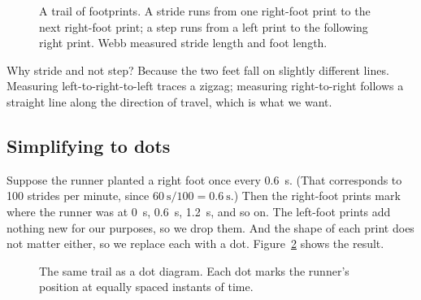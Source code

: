 \documentclass[11pt,twoside,openany]{book}
\begin{document}
\begin{figure}[htb]
\centering
{}
\caption{A trail of footprints. A stride runs from one right-foot print to the next right-foot print; a step runs from a left print to the following right print. Webb measured stride length and foot length.}
\label{fig:footprints}
\end{figure}

Why stride and not step? Because the two feet fall on slightly different lines. Measuring left-to-right-to-left traces a zigzag; measuring right-to-right follows a straight line along the direction of travel, which is what we want.

\subsection{Simplifying to dots}

Suppose the runner planted a right foot once every \SI{0.6}{\second}. (That corresponds to \num{100} strides per minute, since $\SI{60}{\second}/100 = \SI{0.6}{\second}$.) Then the right-foot prints mark where the runner was at \SI{0}{\second}, \SI{0.6}{\second}, \SI{1.2}{\second}, and so on. The left-foot prints add nothing new for our purposes, so we drop them. And the shape of each print does not matter either, so we replace each with a dot. Figure~\ref{fig:dotdiagram} shows the result.

\begin{figure}[htb]
\centering
{}
\caption{The same trail as a dot diagram. Each dot marks the runner's position at equally spaced instants of time.}
\label{fig:dotdiagram}
\end{figure}
\end{document}
